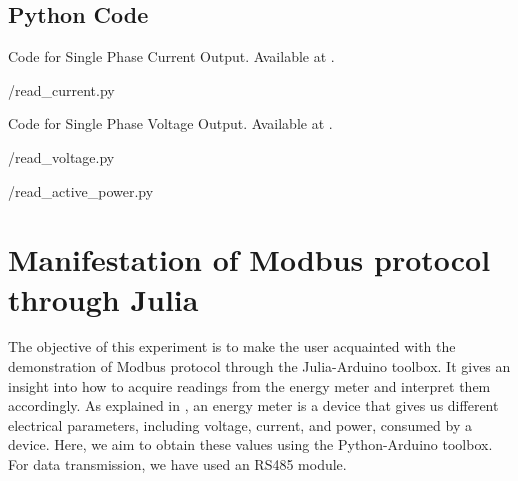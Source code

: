 %   

\subsection{Python Code}
\label{sec:modbus-python-code}

\begin{pycode}
  {Code for Single Phase Current Output.
    Available at .}
  \label{py:current-modbus}
  
  {\LocMODpycode/read_current.py}
\end{pycode}

\begin{pycode}
  {Code for Single Phase Voltage Output.
    Available at .}
  \label{py:voltage-modbus}
  
  {\LocMODpycode/read_voltage.py}
\end{pycode}

\begin{pycode}
  \label{py:modbus-power}
  
  {\LocMODpycode/read_active_power.py}
\end{pycode}


\section{Manifestation of Modbus protocol through Julia}
The objective of this experiment is to make the user acquainted with
the demonstration of Modbus protocol through the Julia-Arduino toolbox. 
It gives an insight into how to acquire readings from the energy meter and interpret them accordingly. As explained in , 
an energy meter is a device that gives us different electrical parameters, including voltage, current, and power, consumed by a device. Here, we aim to obtain these values using the Python-Arduino toolbox. For data transmission, we have used an RS485 module.

